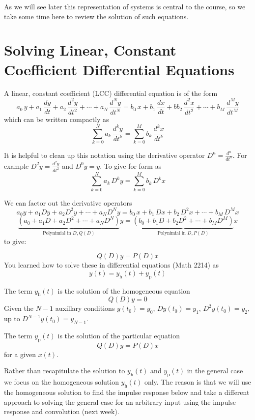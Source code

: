 As we will see later this representation of systems is central to the course, so we take some time here to review the solution of such equations.
 
\section{Solving Linear, Constant Coefficient Differential Equations}

A linear, constant coefficient (LCC) differential equation is of the form
\[
a_0\, y + a_1\, \frac{dy}{dt} + a_2\, \frac{d^2y}{dt^2} + \cdots + a_N\, \frac{d^Ny}{dt^N}  = b_0\, x + b_1\, \frac{dx}{dt} + bb_2\, \frac{d^2x}{dt^2} + \cdots + b_M\, \frac{d^My}{dt^M}
\]
which can be written compactly as
\[
\sum\limits_{k = 0}^{N} a_k\, \frac{d^ky}{dt^k} = \sum\limits_{k = 0}^{M} b_k\, \frac{d^kx}{dt^k}
\]

It is helpful to clean up this notation using the derivative operator $D^n = \frac{d^n}{dt^n}$. For example
$D^2y = \frac{d^2y}{dt^2}$ and $D^0 y= y$. To give for form as
\[
\sum\limits_{k = 0}^{N} a_k\, D^k y = \sum\limits_{k = 0}^{M} b_k\, D^k x
\]

We can factor out the derivative operators
\[
a_0y + a_1Dy + a_2D^2y + \cdots + a_ND^Ny  = b_0\, x + b_1\, Dx + b_2\, D^2x + \cdots + b_M\, D^M x
\]
\[
\underbrace{\left(a_0 + a_1D + a_2D^2 + \cdots + a_ND^N\right)}_{\text{Polynimial in } D, Q(D)} y = \underbrace{\left(b_0 + b_1 D + b_2 D^2 + \cdots + b_M D^M\right)}_{\text{Polynimial in } D, P(D)} x
\]
to give:
  
\[
Q(D)y = P(D)x
\]
You learned how to solve these in differential equations (Math 2214) as
\[
y(t) = y_\text{h}(t) + y_\text{p}(t)
\]

The term $y_\text{h}(t)$ is the solution of the homogeneous equation
\[
Q(D)y = 0
\]
Given the $N-1$ auxillary conditions $y(t_0) = y_0$, $Dy(t_0) = y_1$, $D^2y(t_0) = y_2$, up to $D^{N-1}y(t_0) = y_{N-1}$.

The term $y_\text{p}(t)$ is the solution of the particular equation
\[
Q(D)y = P(D)x
\]
for a given $x(t)$.

Rather than recapitulate the solution to $y_\text{h}(t)$ and $y_\text{p}(t)$ in the general case we focus on the homogeneous solution $y_\text{h}(t)$ only. The reason is that we will use the homogeneous solution to find the impulse response below and take a different approach to solving the general case for an arbitrary input using the impulse response and convolution (next week).

